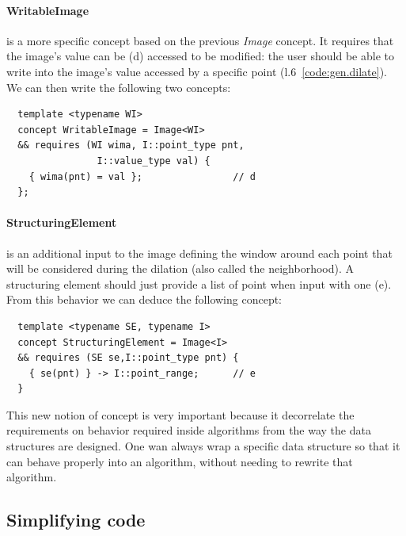 \paragraph{WritableImage} is a more specific concept based on the previous \emph{Image} concept. It requires that the
image's value can be (d) accessed to be modified: the user should be able to write into the image's value accessed by a
specific point (l.6~\ref{code:gen.dilate}). We can then write the following two concepts:
\begin{verbatim}
  template <typename WI>
  concept WritableImage = Image<WI>
  && requires (WI wima, I::point_type pnt,
                I::value_type val) {
    { wima(pnt) = val };                // d
  };
\end{verbatim}

\paragraph{StructuringElement} is an additional input to the image defining the window around each point that will be
considered during the dilation (also called the neighborhood). A structuring element should just provide a list of point
when input with one (e). From this behavior we can deduce the following concept:
\begin{verbatim}
  template <typename SE, typename I>
  concept StructuringElement = Image<I>
  && requires (SE se,I::point_type pnt) {
    { se(pnt) } -> I::point_range;      // e
  }
\end{verbatim}

This new notion of concept is very important because it decorrelate the requirements on behavior required inside
algorithms from the way the data structures are designed. One wan always wrap a specific data structure so that it can
behave properly into an algorithm, without needing to rewrite that algorithm.

\subsection{Simplifying code}
\label{subsec:simplifying}

